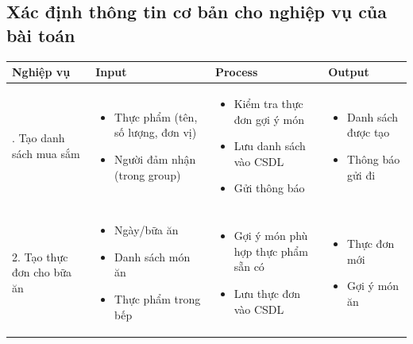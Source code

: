 \documentclass[a4paper,12pt]{article}
\renewcommand{\arraystretch}{1.4} %
\begin{document}
\subsection{Xác định thông tin cơ bản cho nghiệp vụ của bài toán}
\noindent
\begin{table}[H]
    \small %
    \centering
    \renewcommand{\arraystretch}{1.4}
    \setlength{\tabcolsep}{4pt}
    
    \begin{tabularx}{\textwidth}{|>{\RaggedRight\arraybackslash}p{3cm}|X|X|X|}
        \hline
        \rowcolor{gray!20} 
        \textbf{Nghiệp vụ} & \textbf{Input} & \textbf{Process} & \textbf{Output} \\ \hline
        
        1. Tạo danh sách mua sắm & 
        \begin{itemize}[leftmargin=*, nosep]
            \item Thực phẩm (tên, số lượng, đơn vị)
            \item Người đảm nhận (trong group)
        \end{itemize} & 
        \begin{itemize}[leftmargin=*, nosep]
            \item Kiểm tra thực đơn gợi ý món
            \item Lưu danh sách vào CSDL
            \item Gửi thông báo
        \end{itemize} & 
        \begin{itemize}[leftmargin=*, nosep]
            \item Danh sách được tạo
            \item Thông báo gửi đi
        \end{itemize} \\ \hline
        
        2. Tạo thực đơn cho bữa ăn & 
        \begin{itemize}[leftmargin=*, nosep]
            \item Ngày/bữa ăn
            \item Danh sách món ăn
            \item Thực phẩm trong bếp
        \end{itemize} & 
        \begin{itemize}[leftmargin=*, nosep]
            \item Gợi ý món phù hợp thực phẩm sẵn có
            \item Lưu thực đơn vào CSDL
        \end{itemize} & 
        \begin{itemize}[leftmargin=*, nosep]
            \item Thực đơn mới
            \item Gợi ý món ăn
        \end{itemize} \\ \hline
        

\end{tabularx}
\end{table}
\end{document}
